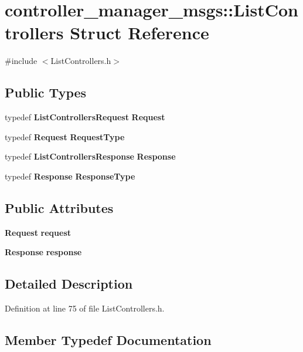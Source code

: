 \section{controller\-\_\-manager\-\_\-msgs\-:\-:\-List\-Controllers \-Struct \-Reference}
\label{structcontroller__manager__msgs_1_1ListControllers}


{\ttfamily \#include $<$\-List\-Controllers.\-h$>$}

\subsection*{\-Public \-Types}
\begin{DoxyCompactItemize}
\item 
typedef {\bf \-List\-Controllers\-Request} {\bf \-Request}
\item 
typedef {\bf \-Request} {\bf \-Request\-Type}
\item 
typedef {\bf \-List\-Controllers\-Response} {\bf \-Response}
\item 
typedef {\bf \-Response} {\bf \-Response\-Type}
\end{DoxyCompactItemize}
\subsection*{\-Public \-Attributes}
\begin{DoxyCompactItemize}
\item 
{\bf \-Request} {\bf request}
\item 
{\bf \-Response} {\bf response}
\end{DoxyCompactItemize}


\subsection{\-Detailed \-Description}


\-Definition at line 75 of file \-List\-Controllers.\-h.



\subsection{\-Member \-Typedef \-Documentation}

